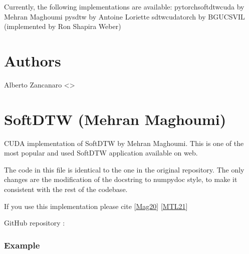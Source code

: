 \documentclass[letterpaper,10pt,english]{sphinxmanual}
\begin{document}
\sphinxAtStartPar
Currently, the following implementations are available:
\sphinxhyphen{} pytorch\sphinxhyphen{}softdtw\sphinxhyphen{}cuda by Mehran Maghoumi
\sphinxhyphen{} pysdtw by Antoine Loriette
\sphinxhyphen{} sdtw\sphinxhyphen{}cuda\sphinxhyphen{}torch by BGU\sphinxhyphen{}CS\sphinxhyphen{}VIL (implemented by Ron Shapira Weber)


\section{Authors}
\label{\detokenize{dtw_loss_functions.soft_dtw_implementations:authors}}
\sphinxAtStartPar
Alberto Zancanaro \textless{}\textgreater{}

\sphinxstepscope


\section{SoftDTW (Mehran Maghoumi)}
\label{\detokenize{dtw_loss_functions.soft_dtw_implementations.soft_dtw_cuda_mag:module-dtw_loss_functions.soft_dtw_implementations.soft_dtw_cuda_mag}}\label{\detokenize{dtw_loss_functions.soft_dtw_implementations.soft_dtw_cuda_mag:softdtw-mehran-maghoumi}}\label{\detokenize{dtw_loss_functions.soft_dtw_implementations.soft_dtw_cuda_mag::doc}}
\sphinxAtStartPar
CUDA implementation of SoftDTW by Mehran Maghoumi. This is one of the most popular and used SoftDTW application available on web.

\sphinxAtStartPar
The code in this file is identical to the one in the original repository.
The only changes are the modification of the docstring to numpydoc style, to make it consistent with the rest of the codebase.

\sphinxAtStartPar
If you use this implementation please cite {[}\hyperlink{cite.biblio:id8}{Mag20}{]} {[}\hyperlink{cite.biblio:id9}{MTL21}{]}

\sphinxAtStartPar
GitHub repository : 
\subsubsection*{Example}
\end{document}
